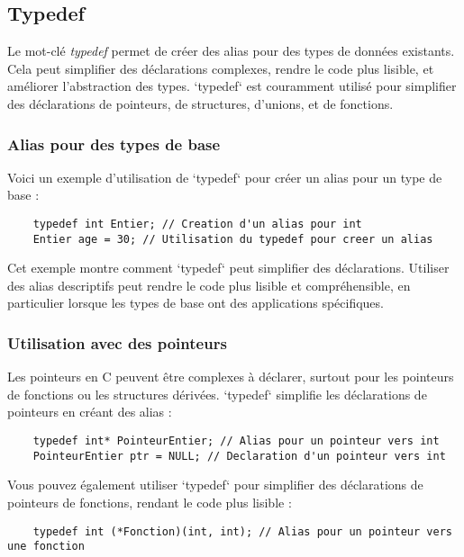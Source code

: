 \subsection{Typedef}

Le mot-clé \emph{typedef} permet de créer des alias pour des types de données existants. Cela peut simplifier des déclarations complexes, rendre le code plus lisible, et améliorer l'abstraction des types. `typedef` est couramment utilisé pour simplifier des déclarations de pointeurs, de structures, d'unions, et de fonctions.

\subsubsection*{Alias pour des types de base}

Voici un exemple d'utilisation de `typedef` pour créer un alias pour un type de base :

\begin{lstlisting}
	typedef int Entier; // Creation d'un alias pour int
	Entier age = 30; // Utilisation du typedef pour creer un alias
\end{lstlisting}

Cet exemple montre comment `typedef` peut simplifier des déclarations. Utiliser des alias descriptifs peut rendre le code plus lisible et compréhensible, en particulier lorsque les types de base ont des applications spécifiques.

\subsubsection*{Utilisation avec des pointeurs}

Les pointeurs en C peuvent être complexes à déclarer, surtout pour les pointeurs de fonctions ou les structures dérivées. `typedef` simplifie les déclarations de pointeurs en créant des alias :

\begin{lstlisting}
	typedef int* PointeurEntier; // Alias pour un pointeur vers int
	PointeurEntier ptr = NULL; // Declaration d'un pointeur vers int
\end{lstlisting}

Vous pouvez également utiliser `typedef` pour simplifier des déclarations de pointeurs de fonctions, rendant le code plus lisible :

\begin{lstlisting}
	typedef int (*Fonction)(int, int); // Alias pour un pointeur vers une fonction
\end{lstlisting}

